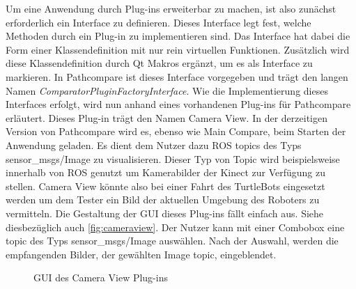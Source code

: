 Um eine Anwendung durch Plug-ins erweiterbar zu machen, ist also zunächst
erforderlich ein Interface zu definieren. Dieses Interface legt fest, welche
Methoden durch ein Plug-in zu implementieren sind. Das Interface hat dabei die
Form einer Klassendefinition mit nur rein virtuellen Funktionen. Zusätzlich
wird diese Klassendefinition durch Qt Makros ergänzt, um es als Interface zu
markieren. In Pathcompare ist dieses Interface vorgegeben und trägt den langen
Namen \textit{ComparatorPluginFactoryInterface}. Wie die Implementierung dieses
Interfaces erfolgt, wird nun anhand eines vorhandenen Plug-ins für Pathcompare
erläutert.  Dieses Plug-in trägt den Namen Camera View. In der derzeitigen
Version von Pathcompare wird es, ebenso wie Main Compare, beim Starten der
Anwendung geladen.  Es dient dem Nutzer dazu ROS topics des Typs
sensor\_msgs/Image zu visualisieren. Dieser Typ von Topic wird beispielsweise
innerhalb von ROS genutzt um Kamerabilder der Kinect zur Verfügung zu stellen.
Camera View könnte also bei einer Fahrt des TurtleBots eingesetzt werden um dem
Tester ein Bild der aktuellen Umgebung des Roboters zu vermitteln. Die
Gestaltung der GUI dieses Plug-ins fällt einfach aus. Siehe diesbezüglich auch
\autoref{fig:cameraview}. Der Nutzer kann mit einer
Combobox eine topic des Typs sensor\_msgs/Image auswählen. Nach der Auswahl, werden die empfangenden
Bilder, der gewählten Image topic, eingeblendet. 

\begin{figure}[t]
  \begin{center}
  \end{center}
  \caption{GUI des Camera View Plug-ins}
  \label{fig:cameraview}
\end{figure}

